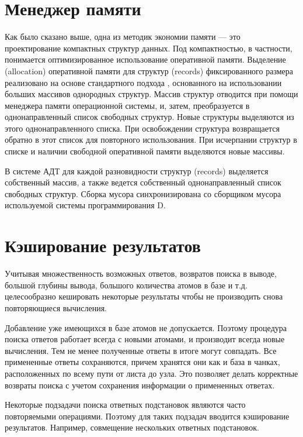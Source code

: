 \section{Менеджер памяти}

Как было сказано выше, одна из методик экономии памяти --- это проектирование компактных структур данных. Под компактностью, в частности, понимается оптимизированное использование оперативной памяти. Выделение (allocation) оперативной памяти для структур (records) фиксированного размера реализовано на основе стандартного подхода \cite{}, основанного на использовании больших массивов однородных структур. Массив структур отводится при помощи менеджера памяти операционной системы, и, затем, преобразуется в однонаправленный список свободных структур. Новые структуры выделяются из этого однонаправленного списка. При освобождении структура возвращается обратно в этот список для повторного использования. При исчерпании структур в списке и наличии свободной оперативной памяти выделяются новые массивы.

В системе АДТ для каждой разновидности структур (records) выделяется собственный массив, а также ведется собственный однонаправленный список свободных структур. Сборка мусора синхронизирована со сборщиком мусора используемой системы программирования D.


\section{Кэширование результатов}
Учитывая множественность возможных ответов, возвратов поиска в выводе, большой глубины вывода, большого количества атомов в базе и т.д. целесообразно кешировать некоторые результаты чтобы не производить снова повторяющиеся вычисления.

Добавление уже имеющихся в базе атомов не допускается. Поэтому процедура поиска ответов работает всегда с новыми атомами, и производит всегда новые вычисления. Тем не менее полученные ответы в итоге могут совпадать. Все примененные ответы сохраняются, причем хранятся они как и база в чанках, расположенных по всему пути от листа до узла. Это позволяет делать корректные возвраты поиска с учетом сохранения информации о примененных ответах.

Некоторые подзадачи поиска ответных подстановок являются часто повторяемыми операциями. Поэтому для таких подзадач вводится кэширование результатов. Например, совмещение нескольких ответных подстановок.



